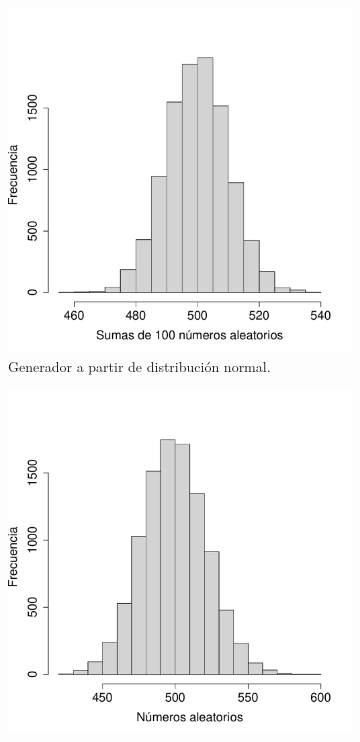 \documentclass[paper=leter, fontsize=11pt]{scrartcl}
\numberwithin{equation}{section}		%
\numberwithin{figure}{section}			%
\numberwithin{table}{section}				%
\begin{document}
\begin{figure}
    \begin{subfigure}{.5\textwidth}
        \centering
        \includegraphics[scale=0.4]{norm.pdf}
        \caption{Generador a partir de distribución normal.}
        \label{norm_izq}
    \end{subfigure}
    \begin{subfigure}{0.5\textwidth}
        \centering
        \includegraphics[scale=0.4]{norm_poisson.pdf}

\end{subfigure}
\end{figure}
\end{document}
